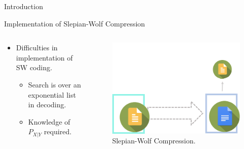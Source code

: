 \documentclass[final,hyperref={pdfpagelabels=false}]{beamer}
\begin{document}
\begin{frame}[t]
\begin{columns}[t]
\begin{column}{.465\textwidth}
\begin{block}{Introduction}
\end{block}



\begin{block}{Implementation of Slepian-Wolf Compression }

\begin{columns} %
\begin{column}{.5\textwidth} %
\begin{itemize}
\item Difficulties in implementation of SW coding.
\begin{itemize}
\item Search is over an exponential list in decoding.
\item Knowledge of $P_{X|Y}$ required. 
\end{itemize}
\end{itemize}
\end{column}

\begin{column}{.5\textwidth} %
\centering
\begin{figure}
\includegraphics[width=0.9\linewidth]{slepian.png}
\caption{Slepian-Wolf Compression.}
\end{figure}
\end{column}
\end{columns} %


\end{block}
\end{column}
\end{columns}
\end{frame}
\end{document}
